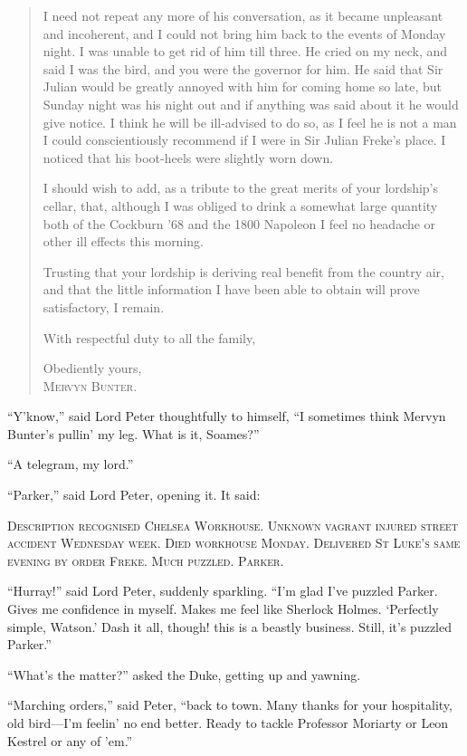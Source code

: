 \begin{quotation}
I need not repeat any more of his conversation, as it became unpleasant and incoherent, and I could not bring him back to the events of Monday night. I was unable to get rid of him till three. He cried on my neck, and said I was the bird, and you were the governor for him. He said that Sir Julian would be greatly annoyed with him for coming home so late, but Sunday night was his night out and if anything was said about it he would give notice. I think he will be ill-advised to do so, as I feel he is not a man I could conscientiously recommend if I were in Sir Julian Freke’s place. I noticed that his boot-heels were slightly worn down.

I should wish to add, as a tribute to the great merits of your lordship’s cellar, that, although I was obliged to drink a somewhat large quantity both of the Cockburn ’68 and the 1800 Napoleon I feel no headache or other ill effects this morning.

Trusting that your lordship is deriving real benefit from the country air, and that the little information I have been able to obtain will prove satisfactory, I remain.

With respectful duty to all the family,

\begin{flushright}
Obediently yours,\\
\textsc{Mervyn Bunter.}
\end{flushright}
\end{quotation}

\enquote{Y’know,} said Lord Peter thoughtfully to himself, \enquote{I sometimes think Mervyn Bunter’s pullin’ my leg. What is it, Soames?}

\enquote{A telegram, my lord.}

\enquote{Parker,} said Lord Peter, opening it. It said:

\textsc{Description recognised Chelsea Workhouse. Unknown vagrant injured street accident Wednesday week. Died workhouse Monday. Delivered St Luke’s same evening by order Freke. Much puzzled. Parker.}

\enquote{Hurray!} said Lord Peter, suddenly sparkling. \enquote{I’m glad I’ve puzzled Parker. Gives me confidence in myself. Makes me feel like Sherlock Holmes. \enquote{Perfectly simple, Watson.} Dash it all, though! this is a beastly business. Still, it’s puzzled Parker.}

\enquote{What’s the matter?} asked the Duke, getting up and yawning.

\enquote{Marching orders,} said Peter, \enquote{back to town. Many thanks for your hospitality, old bird\allowbreak---\allowbreak I’m feelin’ no end better. Ready to tackle Professor Moriarty or Leon Kestrel or any of ’em.}

